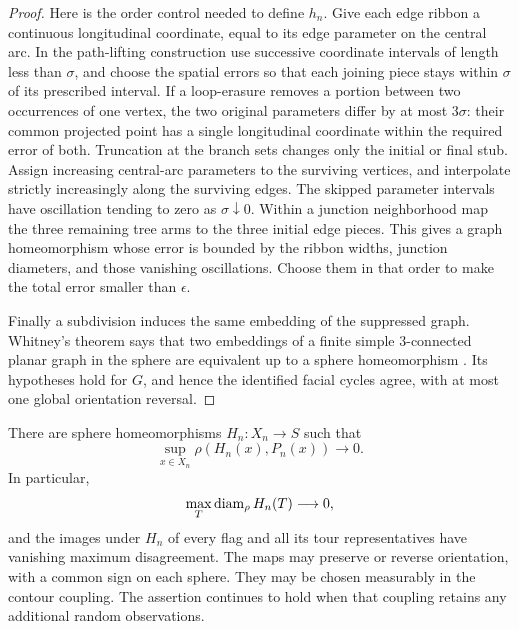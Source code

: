 \begin{proof}
Here is the order control needed to define $h_n$.  Give each edge
ribbon a continuous longitudinal coordinate, equal to its edge
parameter on the central arc.  In the path-lifting construction use
successive coordinate intervals of length less than $\sigma$, and
choose the spatial errors so that each joining piece stays within
$\sigma$ of its prescribed interval.  If a loop-erasure removes a
portion between two occurrences of one vertex, the two original
parameters differ by at most $3\sigma$: their common projected
point has a single longitudinal coordinate within the required
error of both.  Truncation at the branch sets changes only the
initial or final stub.  Assign increasing central-arc parameters to
the surviving vertices, and interpolate strictly increasingly
along the surviving edges.  The skipped parameter intervals have
oscillation tending to zero as $\sigma\downarrow0$.
Within a junction neighborhood map the three remaining tree arms
to the three initial edge pieces.  This gives a graph homeomorphism
whose error is bounded by the ribbon widths, junction diameters,
and those vanishing oscillations.  Choose them in that order to
make the total error smaller than $\epsilon$.

Finally a subdivision induces the same embedding of the suppressed
graph.  Whitney's theorem says that two embeddings of a finite
simple $3$-connected planar graph in the sphere are equivalent up
to a sphere homeomorphism \cite{Whitney1932}.  Its hypotheses hold
for $G$, and hence the identified facial cycles agree, with at most
one global orientation reversal.
\end{proof}

\begin{theorem}
\label{top:homeomorphism}
There are sphere homeomorphisms $H_n:X_n\to S$ such that
\begin{equation}\label{top:homeomorphism-error}
 \sup_{x\in X_n}\rho(H_n(x),P_n(x))\longrightarrow0.
\end{equation}
In particular,
\begin{equation}\label{top:homeomorphism-mesh}
 \max_{T}\diam_\rho H_n(T)\longrightarrow0,
\end{equation}
and the images under $H_n$ of every flag and all its tour
representatives have vanishing maximum disagreement.  The maps may
preserve or reverse orientation, with a common sign on each sphere.
They may be chosen measurably in the contour coupling.  The assertion
continues to hold when that coupling retains any additional random
observations.
\end{theorem}


